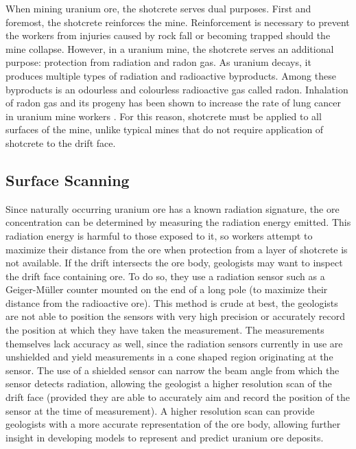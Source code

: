 When mining uranium ore, the shotcrete serves dual purposes. First and foremost, the shotcrete reinforces the mine. Reinforcement is necessary to prevent the workers from injuries caused by rock fall or becoming trapped should the mine collapse. However, in a uranium mine, the shotcrete serves an additional purpose: protection from radiation and radon gas. As uranium decays, it produces multiple types of radiation and radioactive byproducts. Among these byproducts is an odourless and colourless radioactive gas called radon. Inhalation of radon gas and its progeny has been shown to increase the rate of lung cancer in uranium mine workers \cite{radon}. For this reason, shotcrete must be applied to all surfaces of the mine, unlike typical mines that do not require application of shotcrete to the drift face.\\

\subsection{Surface Scanning}

Since naturally occurring uranium ore has a known radiation signature, the ore concentration can be determined by measuring the radiation energy emitted. This radiation energy is harmful to those exposed to it, so workers attempt to maximize their distance from the ore when protection from a layer of shotcrete is not available. If the drift intersects the ore body, geologists may want to inspect the drift face containing ore. To do so, they use a radiation sensor such as a Geiger-M{\"u}ller counter mounted on the end of a long pole (to maximize their distance from the radioactive ore). This method is crude at best, the geologists are not able to position the sensors with very high precision or accurately record the position at which they have taken the measurement. The measurements themselves lack accuracy as well, since the radiation sensors currently in use are unshielded and yield measurements in a cone shaped region originating at the sensor. The use of a shielded sensor can narrow the beam angle from which the sensor detects radiation, allowing the geologist a higher resolution scan of the drift face (provided they are able to accurately aim and record the position of the sensor at the time of measurement). A higher resolution scan can provide geologists with a more accurate representation of the ore body, allowing further insight in developing models to represent and predict uranium ore deposits.\\


